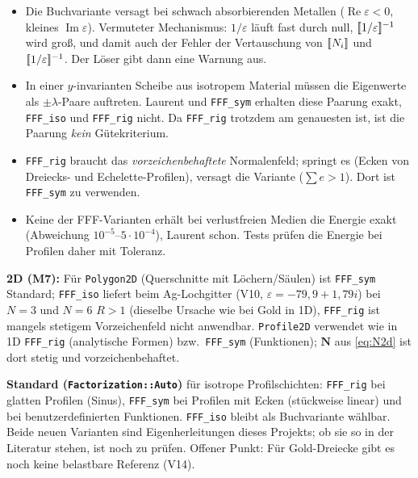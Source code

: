 \begin{itemize}[nosep]
  \item Die Buchvariante versagt bei schwach absorbierenden Metallen ($\operatorname{Re}\varepsilon<0$, kleines
        $\operatorname{Im}\varepsilon$). Vermuteter Mechanismus: $1/\varepsilon$ läuft fast durch null, $[\![1/\varepsilon]\!]^{-1}$ wird groß,
        und damit auch der Fehler der Vertauschung von $[\![N_i]\!]$ und $[\![1/\varepsilon]\!]^{-1}$. Der Löser gibt dann eine Warnung aus.
  \item In einer $y$-invarianten Scheibe aus isotropem Material müssen die Eigenwerte als $\pm\lambda$-Paare
        auftreten. Laurent und \verb|FFF_sym| erhalten diese Paarung exakt, \verb|FFF_iso| und \verb|FFF_rig|
        nicht. Da \verb|FFF_rig| trotzdem am genauesten ist, ist die Paarung \emph{kein} Gütekriterium.
  \item \verb|FFF_rig| braucht das \emph{vorzeichenbehaftete} Normalenfeld; springt es (Ecken von Dreiecks-
        und Echelette-Profilen), versagt die Variante ($\sum e>1$). Dort ist \verb|FFF_sym| zu verwenden.
  \item Keine der FFF-Varianten erhält bei verlustfreien Medien die Energie exakt (Abweichung
        $10^{-5}$--$5\cdot10^{-4}$), Laurent schon. Tests prüfen die Energie bei Profilen daher mit Toleranz.
\end{itemize}
\textbf{2D (M7):} Für \texttt{Polygon2D} (Querschnitte mit Löchern/Säulen) ist \verb|FFF_sym| Standard;
\verb|FFF_iso| liefert beim Ag-Lochgitter (V10, $\varepsilon=-79{,}9+1{,}79i$) bei $N=3$ und $N=6$ $R>1$
(dieselbe Ursache wie bei Gold in 1D), \verb|FFF_rig| ist mangels stetigem Vorzeichenfeld nicht anwendbar.
\texttt{Profile2D} verwendet wie in 1D \verb|FFF_rig| (analytische Formen) bzw.\ \verb|FFF_sym| (Funktionen);
$\mathbf N$ aus \eqref{eq:N2d} ist dort stetig und vorzeichenbehaftet.

\textbf{Standard (\texttt{Factorization::Auto})} für isotrope Profilschichten: \verb|FFF_rig| bei glatten
Profilen (Sinus), \verb|FFF_sym| bei Profilen mit Ecken (stückweise linear) und bei benutzerdefinierten
Funktionen. \verb|FFF_iso| bleibt als Buchvariante wählbar. Beide neuen Varianten sind Eigenherleitungen
dieses Projekts; ob sie so in der Literatur stehen, ist noch zu prüfen. Offener Punkt: Für Gold-Dreiecke
gibt es noch keine belastbare Referenz (V14).

